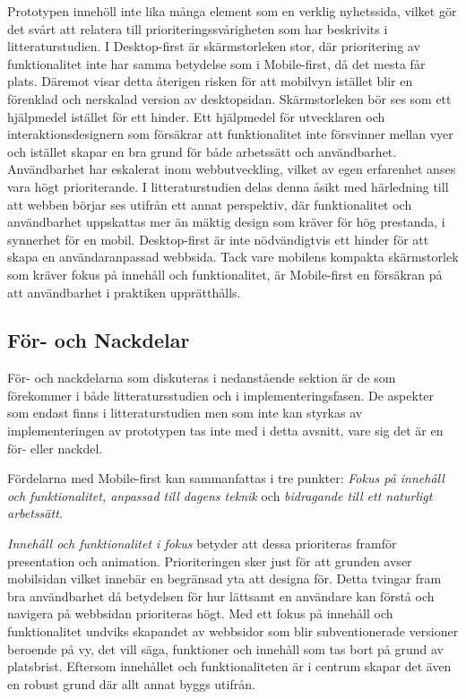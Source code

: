 \documentclass[11pt]{article}
\begin{document}
Prototypen innehöll inte lika många element som en verklig nyhetssida, vilket gör det svårt att relatera till prioriteringssvårigheten som har beskrivits i litteraturstudien. I Desktop-first är skärmstorleken stor, där prioritering av funktionalitet inte har samma betydelse som i Mobile-first, då det mesta får plats. Däremot visar detta återigen risken för att mobilvyn istället blir en förenklad och nerskalad version av desktopsidan. Skärmstorleken bör ses som ett hjälpmedel istället för ett hinder. Ett hjälpmedel för utvecklaren och interaktionsdesignern som försäkrar att funktionalitet inte försvinner mellan vyer och istället skapar en bra grund för både arbetssätt och användbarhet. Användbarhet har eskalerat inom webbutveckling, vilket av egen erfarenhet anses vara högt prioriterande. I litteraturstudien delas denna åsikt med härledning till att webben börjar ses utifrån ett annat perspektiv, där funktionalitet och användbarhet uppskattas mer än mäktig design som kräver för hög prestanda, i synnerhet för en mobil. Desktop-first är inte nödvändigtvis ett hinder för att skapa en användaranpassad webbsida. Tack vare mobilens kompakta skärmstorlek som kräver fokus på innehåll och funktionalitet, är Mobile-first en försäkran på att användbarhet i praktiken upprätthålls.

\subsection{För- och Nackdelar}
För- och nackdelarna som diskuteras i nedanstående sektion är de som förekommer i både litteratursstudien och i implementeringsfasen. De aspekter som endast finns i litteraturstudien men som inte kan styrkas av implementeringen av prototypen tas inte med i detta avsnitt, vare sig det är en för- eller nackdel.

Fördelarna med Mobile-first kan sammanfattas i tre punkter: \textit{Fokus på innehåll och funktionalitet, anpassad till dagens teknik} och \textit{bidragande till ett naturligt arbetssätt.} 

\textit{Innehåll och funktionalitet i fokus} betyder att dessa prioriteras framför presentation och animation. Prioriteringen sker just för att grunden avser mobilsidan vilket innebär en begränsad yta att designa för. Detta tvingar fram bra användbarhet då betydelsen för hur lättsamt en användare kan förstå och navigera på webbsidan prioriteras högt. Med ett fokus på innehåll och funktionalitet undviks skapandet av webbsidor som blir subventionerade versioner beroende på vy, det vill säga, funktioner och innehåll som tas bort på grund av platsbrist. Eftersom innehållet och funktionaliteten är i centrum skapar det även en robust grund där allt annat byggs utifrån.
\end{document}
